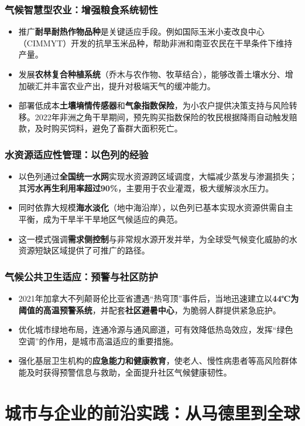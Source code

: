 \documentclass[11pt]{beamer}
\begin{document}
\begin{frame}
\frametitle{气候智慧型农业：增强粮食系统韧性}
\begin{itemize}
    \item 推广\textbf{耐旱耐热作物品种}是关键适应手段。例如国际玉米小麦改良中心（CIMMYT）开发的抗旱玉米品种，帮助非洲和南亚农民在干旱条件下维持产量。
    \item 发展\textbf{农林复合种植系统}（乔木与农作物、牧草结合），能够改善土壤水分、增加碳汇并丰富农业产出，提升对极端天气的缓冲能力。
    \item 部署低成本\textbf{土壤墒情传感器}和\textbf{气象指数保险}，为小农户提供决策支持与风险转移。2022年非洲之角干旱期间，预先购买指数保险的牧民根据降雨自动触发赔款，及时购买饲料，避免了畜群大面积死亡。
\end{itemize}
\end{frame}

\begin{frame}
\frametitle{水资源适应性管理：以色列的经验}
\begin{itemize}
    \item 以色列通过\textbf{全国统一水网}实现水资源跨区域调度，大幅减少蒸发与渗漏损失；其\textbf{污水再生利用率超过90\%}，主要用于农业灌溉，极大缓解淡水压力。
    \item 同时依靠大规模\textbf{海水淡化}（地中海沿岸），以色列已基本实现水资源供需自主平衡，成为干旱半干旱地区气候适应的典范。
    \item 这一模式强调\textbf{需求侧控制}与非常规水源开发并举，为全球受气候变化威胁的水资源短缺区域提供了可推广的路径。
\end{itemize}
\end{frame}

\begin{frame}
\frametitle{气候公共卫生适应：预警与社区防护}
\begin{itemize}
    \item 2021年加拿大不列颠哥伦比亚省遭遇“热穹顶”事件后，当地迅速建立以\textbf{44℃为阈值的高温预警系统}，并配套\textbf{社区避暑中心}，为脆弱人群提供紧急庇护。
    \item 优化城市绿地布局，连通冷源与通风廊道，可有效降低热岛效应，发挥“绿色空调”的作用，是城市高温适应的重要措施。
    \item 强化基层卫生机构的\textbf{应急能力和健康教育}，使老人、慢性病患者等高风险群体能及时获得预警信息与救助，全面提升社区气候健康韧性。
\end{itemize}
\end{frame}

\section{城市与企业的前沿实践：从马德里到全球}
\end{document}
